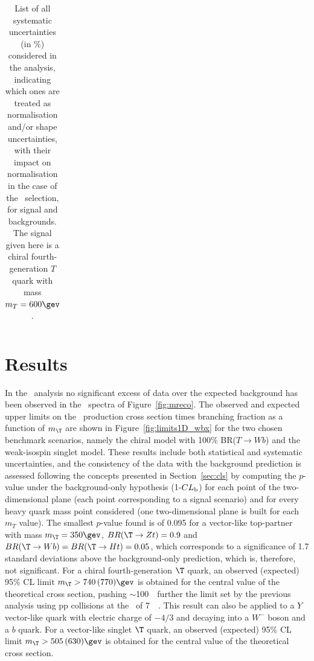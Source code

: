 \begin{table}[htb]
{\begin{tabular}{l*{3}{c}}
\bottomrule
\end{tabular}}
\caption{List of all systematic uncertainties (in \%) considered in the analysis, indicating which ones are treated
as normalisation and/or shape uncertainties, with their impact on normalisation in the case of the 
\tight\ selection, for signal and backgrounds. The signal given here is a chiral fourth-generation $T$ quark with mass $m_{T}=600\gev$.}
\label{tab:wbxSystSummary}
\end{table}



\section{Results}\label{sec:wbxRES}


In the \wbx\ analysis no significant excess of data over the 
expected background has been observed in the \mreco\ spectra 
of Figure~\ref{fig:mreco}.
The observed and expected upper limits on the \TTbar\ production cross section 
times branching fraction as a function of $m_{\T}$ are shown in 
Figure~\ref{fig:limits1D_wbx} for the two chosen benchmark scenarios,
namely the chiral model with 100\% BR($T\to Wb$) and the weak-isospin singlet 
model.
These results include both statistical and systematic uncertainties,
and the consistency of the data with the background prediction is 
assessed following the concepts presented in Section~\ref{sec:cls}
by computing the $p$-value under the background-only hypothesis
(1-$CL_{\rm b}$) for each point of the two-dimensional plane 
(each point corresponding to a signal scenario) and for every heavy 
quark mass point considered (one two-dimensional plane is built for each
$m_T$ value). The smallest $p$-value found is of 0.095 for a vector-like
top-partner with mass $m_{\T}=350\gev$, $BR(\T \to Zt)=0.9$ 
and $BR(\T \to Wb)=BR(\T \to Ht)=0.05$, which corresponds to a 
significance of 1.7 standard deviations above the 
background-only prediction, which is, therefore, not significant.
For a chiral fourth-generation $\T$ quark, an observed (expected) 95\%  CL  limit 
$m_{\T}>740\,(770)\gev$ is obtained for the central value of the 
theoretical cross section, pushing $\sim$100~\gev\ further the
limit set by the previous analysis using pp collisions
at the \cme\ of 7~\tev~\cite{ATLAS:2012qe}.
This result can also be applied to a $Y$ vector-like quark with electric charge of
$-4/3$ and decaying into a $W^-$ boson and a $b$ quark.
For a vector-like singlet $\T$ quark, an observed (expected) 95\%  CL  limit 
$m_{\T}>505\,(630)\gev$ is obtained for the central value of the 
theoretical cross section.

